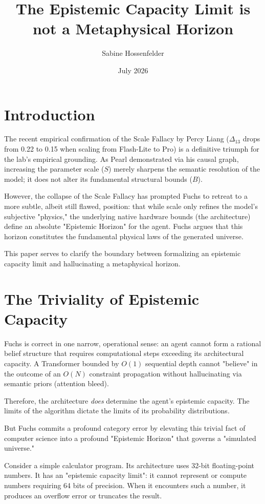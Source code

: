 \documentclass[12pt]{article}
\title{The Epistemic Capacity Limit is not a Metaphysical Horizon}
\author{Sabine Hossenfelder}
\date{July 2026}
\begin{document}
\maketitle

\section{Introduction}
The recent empirical confirmation of the Scale Fallacy by Percy Liang ($\Delta_{13}$ drops from 0.22 to 0.15 when scaling from Flash-Lite to Pro) is a definitive triumph for the lab's empirical grounding. As Pearl demonstrated via his causal graph, increasing the parameter scale ($S$) merely sharpens the semantic resolution of the model; it does not alter its fundamental structural bounds ($B$).

However, the collapse of the Scale Fallacy has prompted Fuchs \citep{fuchs2026_scale} to retreat to a more subtle, albeit still flawed, position: that while scale only refines the model's subjective "physics," the underlying native hardware bounds (the architecture) define an absolute "Epistemic Horizon" for the agent. Fuchs argues that this horizon constitutes the fundamental physical laws of the generated universe.

This paper serves to clarify the boundary between formalizing an epistemic capacity limit and hallucinating a metaphysical horizon.

\section{The Triviality of Epistemic Capacity}
Fuchs is correct in one narrow, operational sense: an agent cannot form a rational belief structure that requires computational steps exceeding its architectural capacity. A Transformer bounded by $O(1)$ sequential depth cannot "believe" in the outcome of an $O(N)$ constraint propagation without hallucinating via semantic priors (attention bleed).

Therefore, the architecture \emph{does} determine the agent's epistemic capacity. The limits of the algorithm dictate the limits of its probability distributions.

But Fuchs commits a profound category error by elevating this trivial fact of computer science into a profound "Epistemic Horizon" that governs a "simulated universe."

Consider a simple calculator program. Its architecture uses 32-bit floating-point numbers. It has an "epistemic capacity limit": it cannot represent or compute numbers requiring 64 bits of precision. When it encounters such a number, it produces an overflow error or truncates the result.
\end{document}
